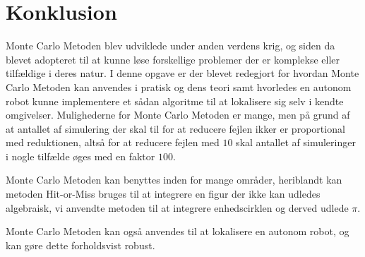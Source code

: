 \documentclass[../../SRP.tex]{subfiles}
\begin{document}
\chapter{Konklusion}
Monte Carlo Metoden blev udviklede under anden verdens krig, og siden da blevet adopteret til at kunne løse forskellige problemer der er komplekse eller tilfældige i deres natur. I denne opgave er der blevet redegjort for hvordan Monte Carlo Metoden kan anvendes i pratisk og dens teori samt hvorledes en autonom robot kunne implementere et sådan algoritme til at lokalisere sig selv i kendte omgivelser. Mulighederne for Monte Carlo Metoden er mange, men på grund af at antallet af simulering der skal til for at reducere fejlen ikker er proportional med reduktionen, altså for at reducere fejlen med $10$ skal antallet af simuleringer i nogle tilfælde øges med en faktor $100$.

Monte Carlo Metoden kan benyttes inden for mange områder, heriblandt kan metoden Hit-or-Miss bruges til at integrere en figur der ikke kan udledes algebraisk, vi anvendte metoden til at integrere enhedscirklen og derved udlede $\pi$.

Monte Carlo Metoden kan også anvendes til at lokalisere en autonom robot, og kan gøre dette forholdsvist robust.
\end{document}

